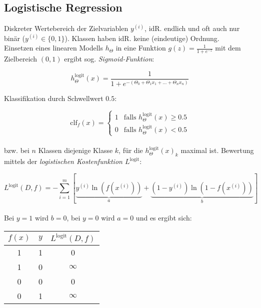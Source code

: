 \subsection{Logistische Regression}
\label{LogRegression}
Diskreter Wertebereich der Zielvariablen $y^{(i)}$, idR. endlich und oft auch nur binär ($y^{(i)} \in \{0,1\}$). Klassen haben idR. keine (eindeutige) Ordnung.\\

Einsetzen eines linearen Modells $h_\Theta$ in eine Funktion $g(z)=\frac{1}{1+e^{-z}}$ mit dem Zielbereich $(0,1)$  ergibt sog. \emph{Sigmoid-Funktion}:

\begin{equation*}
    h_\Theta^{\text{logit}}(x) = \frac{1}{1+e^{-(\Theta_0 + \Theta_1x_1 + \dots + \Theta_nx_n)}}
\end{equation*}

Klassifikation durch Schwellwert $0.5$:

\begin{equation*}
    \text{clf}_f(x) = \left\{
        \begin{array}{ll}
            1 & \text{falls } h_\Theta^{\text{logit}}(x) \geq 0.5\\
            0 & \text{falls } h_\Theta^{\text{logit}}(x) < 0.5
        \end{array}
    \right.
\end{equation*}\\

bzw. bei $n$ Klassen diejenige Klasse $k$, für die $h_\Theta^{\text{logit}}(x)_k$ maximal ist. Bewertung mittels der \emph{logistischen Kostenfunktion $L^\text{logit}$}:

\begin{equation*}
    L^\text{logit}(D, f) = -\sum_{i=1}^{m}\left[\underset{a}{\underbrace{y^{(i)}\ln(f(x^{(i)}))}} + \underset{b}{\underbrace{(1-y^{(i)})\ln(1-f(x^{(i)}))}}\right]
\end{equation*}\\

Bei $y=1$ wird $b = 0$, bei $y=0$ wird $a=0$ und es ergibt sich:


\begin{center}
    \begin{tabular}{|c|c|c|}
        \hline
        $f(x)$ & $y$ & $L^\text{logit}(D, f)$\\
        \hline
        1 & 1 & 0\\
        1 & 0 & $\infty$\\
        0 & 0 & 0\\
        0 & 1 & $\infty$\\
        \hline
    \end{tabular}
\end{center}

